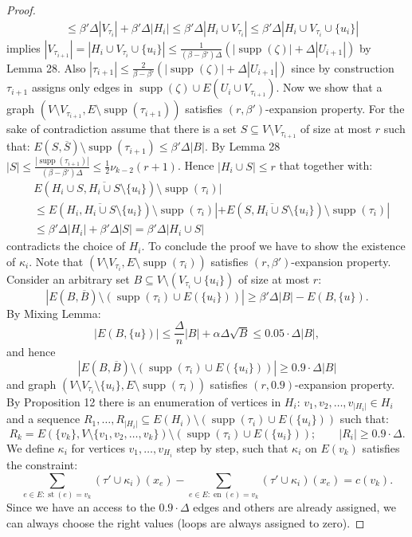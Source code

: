 \documentclass[10pt,a4paper]{article}
\newcommand{\supp}{\operatorname{supp}}
\newcommand{\st}{\operatorname{st}}
\newcommand{\en}{\operatorname{en}}
\begin{document}
\begin{proof}
\begin{align*}
&\le\beta'\Delta|V_{\tau_i}|+\beta'\Delta|H_i|\le\beta'\Delta|H_i\cup V_{\tau_i}|\le\beta'\Delta|H_i\cup V_{\tau_i}\cup\{u_i\}|
\end{align*}
implies $|V_{\tau_{i+1}}|=|H_i\cup V_{\tau_i}\cup\{u_i\}|\le\frac{1}{(\beta-\beta')\Delta}(|\supp(\zeta)|+\Delta|U_{i+1}|)$ by Lemma 28. Also $|\tau_{i+1}|\le\frac{2}{\beta-\beta'}(|\supp(\zeta)|+\Delta|U_{i+1}|)$ since by construction $\tau_{i+1}$ assigns only edges in $\supp(\zeta)\cup E(U_i\cup V_{\tau_{i+1}})$.
Now we show that a graph $(V\setminus V_{\tau_{i+1}},E\setminus\supp(\tau_{i+1}))$ satisfies $(r,\beta')$-expansion property. For the sake of contradiction assume that there is a set $S\subseteq V\setminus V_{\tau_{i+1}}$ of size at most $r$ such that: $E(S,\overline S)\setminus\supp(\tau_{i+1})\le\beta'\Delta|B|$.
By Lemma 28 $|S|\le\frac{|\supp(\tau_{i+1})|}{(\beta-\beta')\Delta}\le\tfrac12\nu_{k-2}(r+1)$. Hence $|H_i\cup S|\le r$ that together with:
\begin{align*}
&E(H_i\cup S,\overline{H_i\cup S}\setminus\{u_i\})\setminus\supp(\tau_i)|\\
&\le E(H_i,\overline{H_i\cup S}\setminus\{u_i\})\setminus\supp(\tau_i)|+E(S,\overline{H_i\cup S}\setminus\{u_i\})\setminus\supp(\tau_i)|\\
&\le\beta'\Delta|H_i|+\beta'\Delta|S|=\beta'\Delta|H_i\cup S|
\end{align*}
contradicts the choice of $H_i$.
To conclude the proof we have to show the existence of $\kappa_i$. Note that $(V\setminus V_{\tau_i},E\setminus\supp(\tau_i))$ satisfies $(r,\beta')$-expansion property. Consider an arbitrary set $B\subseteq V\setminus(V_{\tau_i}\cup\{u_i\})$ of size at most $r$:
\[|E(B,\overline B)\setminus(\supp(\tau_i)\cup E(\{u_i\}))|\ge\beta'\Delta|B|-E(B,\{u\}).\]
By Mixing Lemma:
\[|E(B,\{u\})|\le\frac\Delta n|B|+\alpha\Delta\sqrt B\le0.05\cdot\Delta|B|,\]
and hence
\[|E(B,\overline B)\setminus(\supp(\tau_i)\cup E(\{u_i\}))|\ge0.9\cdot\Delta|B|\]
and graph $(V\setminus V_{\tau_i}\setminus\{u_i\},E\setminus\supp(\tau_i))$ satisfies $(r,0.9)$-expansion property.
By Proposition 12 there is an enumeration of vertices in $H_i$: $v_1,v_2,\ldots,v_{|H_i|}\in H_i$ and a sequence $R_1,\ldots,R_{|H_i|}\subseteq E(H_i)\setminus(\supp(\tau_i)\cup E(\{u_i\}))$ such that:
\[R_k=E(\{v_k\},V\setminus\{v_1,v_2,\ldots,v_k\})\setminus(\supp(\tau_i)\cup E(\{u_i\}));\qquad |R_i|\ge0.9\cdot\Delta.\]
We define $\kappa_i$ for vertices $v_1,\ldots,v_{H_i}$ step by step, such that $\kappa_i$ on $E(v_k)$ satisfies the constraint:
\[\sum_{e\in E:\st(e)=v_k}(\tau'\cup\kappa_i)(x_e)-\sum_{e\in E:\en(e)=v_k}(\tau'\cup\kappa_i)(x_e)=c(v_k).\]
Since we have an access to the $0.9\cdot\Delta$ edges and others are already assigned, we can always choose the right values (loops are always assigned to zero).
\end{proof}
\end{document}
